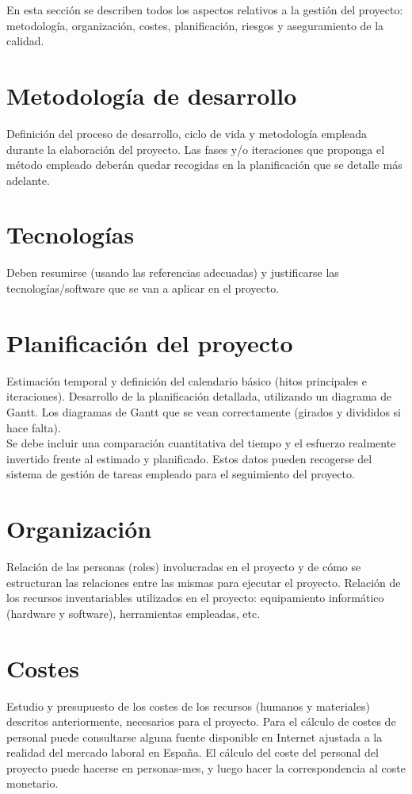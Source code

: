 En esta sección se describen todos los aspectos relativos a la gestión del proyecto: metodología, organización, costes, planificación, riesgos y aseguramiento de la calidad.

\section{Metodología de desarrollo}
Definición del proceso de desarrollo, ciclo de vida y metodología empleada durante la elaboración del proyecto. Las fases y/o iteraciones que proponga el método empleado deberán quedar recogidas en la planificación que se detalle más adelante.

\section{Tecnologías}

Deben resumirse (usando las referencias adecuadas) y justificarse las tecnologías/software que se van a aplicar en el proyecto.

\section{Planificación del proyecto}
Estimación temporal y definición del calendario básico (hitos principales e iteraciones). Desarrollo de la planificación detallada, utilizando un diagrama de Gantt. Los diagramas de Gantt que se vean correctamente (girados y divididos si hace falta).\\

Se debe incluir una comparación cuantitativa del tiempo y el esfuerzo realmente invertido frente al estimado y planificado. Estos datos pueden recogerse del sistema de gestión de tareas empleado para el seguimiento del proyecto.

\section{Organización}
Relación de las personas (roles) involucradas en el proyecto y de cómo se estructuran las relaciones entre las mismas para ejecutar el proyecto. Relación de los recursos inventariables utilizados en el proyecto: equipamiento informático (hardware y software), herramientas empleadas, etc. \\

\section{Costes}
Estudio y presupuesto de los costes de los recursos (humanos y materiales) descritos anteriormente, necesarios para el proyecto. Para el cálculo de costes de personal puede consultarse alguna fuente disponible en Internet ajustada a la realidad del mercado laboral en España. El cálculo del coste del personal del proyecto puede hacerse en personas-mes, y luego hacer la correspondencia al coste monetario.\\


